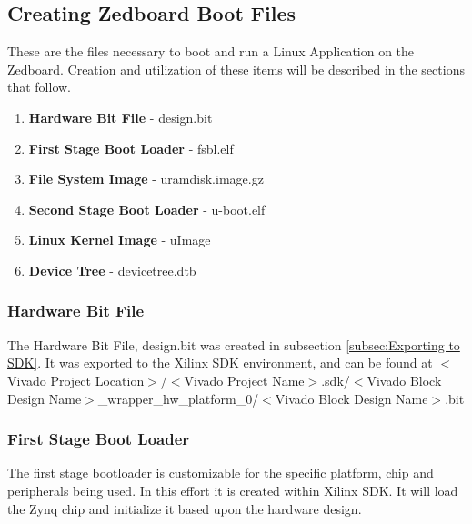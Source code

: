 \subsection{Creating Zedboard Boot Files} \label{subsec:ZedboardBoot} These are the files necessary to boot and run a Linux Application on the Zedboard.  Creation and utilization of these items will be described in the sections that follow.
\begin{enumerate}
\item{\textbf{Hardware Bit File}}\label{itm:bit} - design.bit
\item{\textbf{First Stage Boot Loader}}\label{itm:fsbl} - fsbl.elf
\item{\textbf{File System Image}}\label{itm:uramdisk} - uramdisk.image.gz
\item{\textbf{Second Stage Boot Loader}}\label{itm:uboot} - u-boot.elf
\item{\textbf{Linux Kernel Image}}\label{itm:uImage} - uImage
\item{\textbf{Device Tree}}\label{itm:devicetree} - devicetree.dtb
\end{enumerate}

\subsubsection{Hardware Bit File}
The Hardware Bit File, design.bit was created in subsection \ref{subsec:Exporting to SDK}.  It was exported to the Xilinx SDK environment, and can be found at $<$Vivado Project Location$>$/$<$Vivado Project Name$>$.sdk/$<$Vivado Block Design Name$>$\_wrapper\_hw\_platform\_0/$<$Vivado Block Design Name$>$.bit
\subsubsection{First Stage Boot Loader} \label{subsec:FSBL}
The first stage bootloader is customizable for the specific platform, chip and peripherals being used.  In this effort it is created within Xilinx SDK.  It will load the Zynq chip and initialize it based upon the hardware design.

